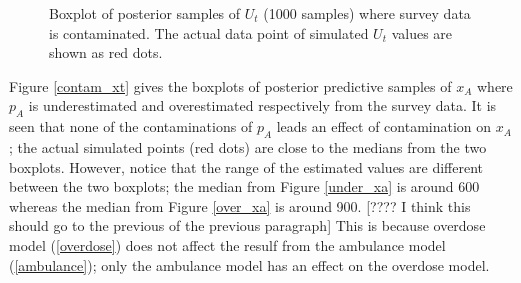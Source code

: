 \documentclass[12pt]{article}
\begin{document}
\begin{figure}[htb]
	\centering
	\caption[two early result box plots:ut]{Boxplot of posterior samples of $U_t$ (1000 samples) where survey data is contaminated.  The actual data point of simulated $U_t$ values are shown as red dots.}
	\label{contam_ut}
\end{figure}

Figure \ref{contam_xt}  gives the boxplots of posterior predictive samples of $x_A$ where $p_A$ is underestimated and overestimated respectively from the survey data. It is seen that none of the contaminations of $p_A$ leads an effect of contamination on $x_A$; the actual simulated points (red dots) are close to the medians from the two boxplots. However, notice that the range of the estimated values are different between the two boxplots; the median from Figure \ref{under_xa} is around 600 whereas the median from Figure \ref{over_xa} is around 900. [???? I think this should go to the previous of the previous paragraph] This is because overdose model (\ref{overdose}) does not affect the resulf from the ambulance model (\ref{ambulance}); only the ambulance model has an effect on the overdose model.
\end{document}
